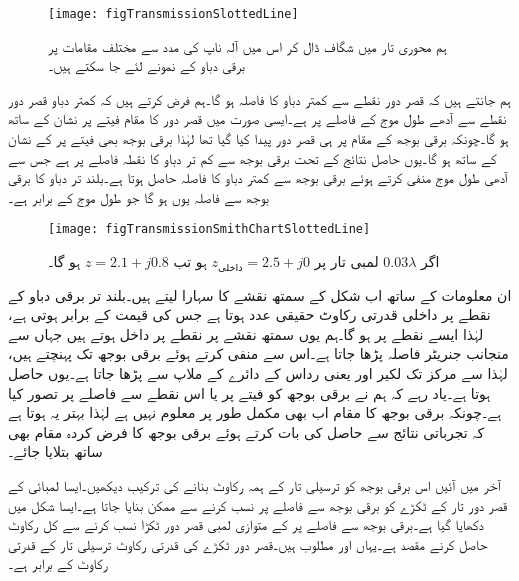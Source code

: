 \begin{figure}
\centering
\texttt{[image: figTransmissionSlottedLine]}
\caption{ہم محوری تار میں شگاف ڈال کر اس میں آلہ ناپ کی مدد سے مختلف مقامات پر برقی دباو  کے نمونے لئے جا سکتے ہیں۔}
\label{شکل_ترسیلی_ہم_محوری_شگاف_دار}
\end{figure}
ہم جانتے ہیں کہ قصر دور نقطے سے کمتر دباو کا فاصلہ  ہو گا۔ہم فرض کرتے ہیں کہ کمتر دباو قصر دور نقطے سے آدھے طول موج کے فاصلے پر ہے۔ایسی صورت میں قصر دور کا مقام فیتے پر  نشان کے ساتھ ہو گا۔چونکہ برقی بوجھ کے مقام پر ہی قصر دور پیدا کیا گیا تھا لہٰذا برقی بوجھ بھی فیتے پر  کے نشان کے ساتھ ہو گا۔یوں حاصل نتائج کے تحت برقی بوجھ سے کم تر دباو کا نقطہ  فاصلے پر ہے جس سے آدھی طول موج منفی کرتے ہوئے برقی بوجھ سے کمتر دباو کا فاصلہ  حاصل ہوتا ہے۔بلند تر دباو کا برقی بوجھ سے فاصلہ یوں
  ہو گا جو  طول موج کے برابر ہے۔
\begin{figure}
\centering
\texttt{[image: figTransmissionSmithChartSlottedLine]}
\caption{اگر $0.03\lambda$ لمبی تار پر $z_{\text{داخلی}}=2.5+j0$ ہو تب $z=2.1+j0.8$ ہو گا۔}
\label{شکل_ترسیلی_ہم_محوری_تجرباتی_نتائج}
\end{figure}

ان معلومات کے ساتھ اب شکل  کے سمتھ نقشے کا سہارا لیتے ہیں۔بلند تر برقی دباو کے نقطے پر  داخلی قدرتی رکاوٹ حقیقی عدد ہوتا ہے جس کی قیمت  کے برابر ہوتی ہے، لہٰذا ایسے نقطے پر  ہو گا۔ہم یوں سمتھ نقشے پر  نقطے پر داخل ہوتے ہیں جہاں سے منجانب جنریٹر فاصلہ  پڑھا جاتا ہے۔اس سے  منفی کرتے ہوئے  برقی بوجھ تک پہنچتے ہیں، لہٰذا  سے مرکز تک لکیر اور  یعنی      رداس کے دائرے کے ملاپ سے  پڑھا جاتا ہے۔یوں  حاصل ہوتا ہے۔یاد رہے کہ ہم نے برقی بوجھ کو فیتے پر  یا اس نقطے سے  فاصلے پر تصور کیا ہے۔چونکہ برقی بوجھ کا مقام اب بھی مکمل طور پر معلوم نہیں ہے لہٰذا بہتر یہ ہوتا ہے کہ تجرباتی نتائج سے حاصل  کی بات کرتے ہوئے برقی بوجھ کا فرض کردہ مقام بھی ساتھ بتلایا جائے۔

آخر میں آئیں اس برقی بوجھ کو  ترسیلی تار کے ہمہ رکاوٹ بنانے کی ترکیب دیکھیں۔ایسا  لمبائی کے قصر دور تار کے ٹکڑے کو برقی بوجھ سے  فاصلے پر نسب کرنے سے ممکن بنایا جاتا ہے۔ایسا شکل  میں دکھایا گیا ہے۔برقی بوجھ سے  فاصلے پر  کے متوازی  لمبی قصر دور ٹکڑا نسب کرنے سے کل رکاوٹ  حاصل کرنے مقصد ہے۔یہاں  اور  مطلوب ہیں۔قصر دور ٹکڑے کی قدرتی رکاوٹ ترسیلی تار کے قدرتی رکاوٹ  کے برابر ہے۔ 

